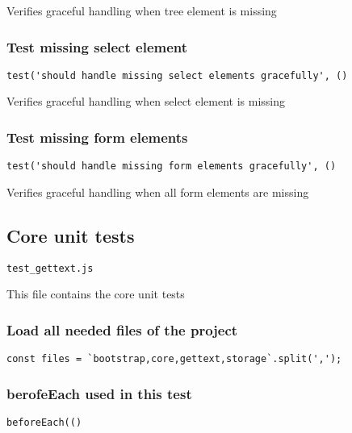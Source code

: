 \documentclass[a4paper]{article}
\begin{document}
Verifies graceful handling when tree element is missing

\hypertarget{toc176}{}
\subsubsection{Test missing select element}

\begin{lstlisting}
test('should handle missing select elements gracefully', ()
\end{lstlisting}

Verifies graceful handling when select element is missing

\hypertarget{toc177}{}
\subsubsection{Test missing form elements}

\begin{lstlisting}
test('should handle missing form elements gracefully', ()
\end{lstlisting}

Verifies graceful handling when all form elements are missing

\hypertarget{toc178}{}
\subsection{Core unit tests}

\begin{lstlisting}
test_gettext.js
\end{lstlisting}

This file contains the core unit tests

\hypertarget{toc179}{}
\subsubsection{Load all needed files of the project}

\begin{lstlisting}
const files = `bootstrap,core,gettext,storage`.split(',');
\end{lstlisting}

\hypertarget{toc180}{}
\subsubsection{berofeEach used in this test}

\begin{lstlisting}
beforeEach(()
\end{lstlisting}
\end{document}
